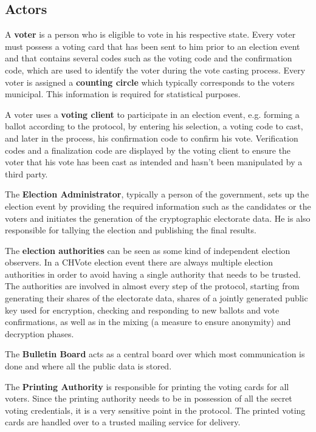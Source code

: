 \subsection{Actors}
A \textbf{voter} is a person who is eligible to vote in his respective state. Every voter must possess a voting card that has been sent to him prior to an election event and that contains several codes such as the voting code and the confirmation code, which are used to identify the voter during the vote casting process. Every voter is assigned a \textbf{counting circle} which typically corresponds to the voters municipal. This information is required for statistical purposes. 

A voter uses a \textbf{voting client} to participate in an election event, e.g. forming a ballot according to the protocol, by entering his selection, a voting code to cast, and later in the process, his confirmation code to confirm his vote. Verification codes and a finalization code are displayed by the voting client to ensure the voter that his vote has been cast as intended and hasn't been manipulated by a third party.

The \textbf{Election Administrator}, typically a person of the government, sets up the election event by providing the required information such as the candidates or the voters and initiates the generation of the cryptographic electorate data. He is also responsible for tallying the election and publishing the final results.

The \textbf{election authorities} can be seen as some kind of independent election observers. In a CHVote election event there are always multiple election authorities in order to avoid having a single authority that needs to be trusted. The authorities are involved in almost every step of the protocol, starting from generating their shares of the electorate data, shares of a jointly generated public key used for encryption, checking and responding to new ballots and vote confirmations, as well as in the mixing (a measure to ensure anonymity) and decryption phases.

The \textbf{Bulletin Board} acts as a central board over which most communication is done and where all the public data is stored.

The \textbf{Printing Authority} is responsible for printing the voting cards for all voters. Since the printing authority needs to be in possession of all the secret voting credentials, it is a very sensitive point in the protocol. The printed voting cards are handled over to a trusted mailing service for delivery.

